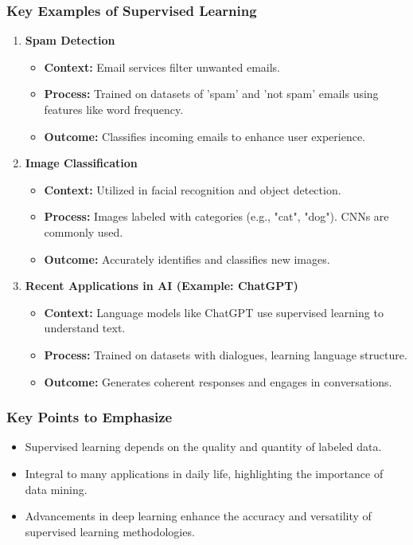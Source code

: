 \documentclass[aspectratio=169]{beamer}
\begin{document}
\begin{frame}[fragile]
    \frametitle{Key Examples of Supervised Learning}
    \begin{enumerate}
        \item \textbf{Spam Detection}
            \begin{itemize}
                \item \textbf{Context:} Email services filter unwanted emails.
                \item \textbf{Process:} Trained on datasets of 'spam' and 'not spam' emails using features like word frequency.
                \item \textbf{Outcome:} Classifies incoming emails to enhance user experience.
            \end{itemize}
        
        \item \textbf{Image Classification}
            \begin{itemize}
                \item \textbf{Context:} Utilized in facial recognition and object detection.
                \item \textbf{Process:} Images labeled with categories (e.g., "cat", "dog"). CNNs are commonly used.
                \item \textbf{Outcome:} Accurately identifies and classifies new images.
            \end{itemize}
        
        \item \textbf{Recent Applications in AI (Example: ChatGPT)}
            \begin{itemize}
                \item \textbf{Context:} Language models like ChatGPT use supervised learning to understand text.
                \item \textbf{Process:} Trained on datasets with dialogues, learning language structure.
                \item \textbf{Outcome:} Generates coherent responses and engages in conversations.
            \end{itemize}
    \end{enumerate}
\end{frame}

\begin{frame}[fragile]
    \frametitle{Key Points to Emphasize}
    \begin{itemize}
        \item Supervised learning depends on the quality and quantity of labeled data.
        \item Integral to many applications in daily life, highlighting the importance of data mining.
        \item Advancements in deep learning enhance the accuracy and versatility of supervised learning methodologies.
    \end{itemize}
\end{frame}
\end{document}
